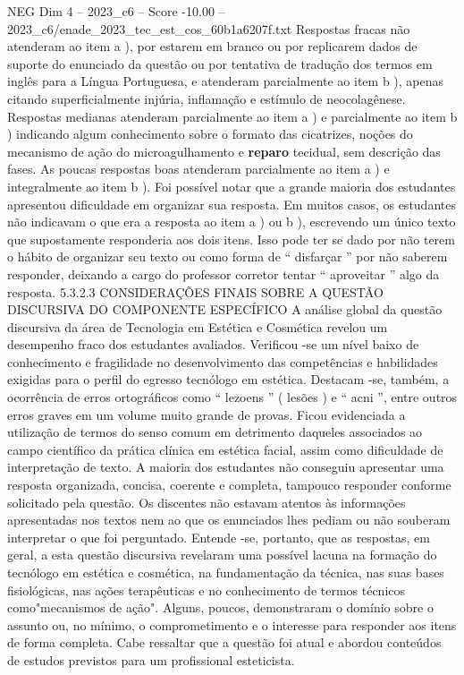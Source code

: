 \begin{textsample}{NEG Dim 4 – 2023\_c6 – Score -10.00 – 2023\_c6/enade\_2023\_tec\_est\_cos\_60b1a6207f.txt}
Respostas fracas não atenderam ao item a ), por estarem em branco ou por replicarem dados de suporte do enunciado da questão ou por tentativa de tradução dos termos em inglês para a Língua Portuguesa, e atenderam parcialmente ao item b ), apenas citando superficialmente injúria, inflamação e estímulo de neocolagênese.
Respostas medianas atenderam parcialmente ao item a ) e parcialmente ao item b ) indicando algum conhecimento sobre o formato das cicatrizes, noções do mecanismo de ação do microagulhamento e \textbf{reparo} tecidual, sem descrição das fases.
As poucas respostas boas atenderam parcialmente ao item a ) e integralmente ao item b ).
Foi possível notar que a grande maioria dos estudantes apresentou dificuldade em organizar sua resposta.
Em muitos casos, os estudantes não indicavam o que era a resposta ao item a ) ou b ), escrevendo um único texto que supostamente responderia aos dois itens.
Isso pode ter se dado por não terem o hábito de organizar seu texto ou como forma de “ disfarçar ” por não saberem responder, deixando a cargo do professor corretor tentar “ aproveitar ” algo da resposta. 5.3.2.3 CONSIDERAÇÕES FINAIS SOBRE A QUESTÃO DISCURSIVA DO COMPONENTE ESPECÍFICO A análise global da questão discursiva da área de Tecnologia em Estética e Cosmética revelou um desempenho fraco dos estudantes avaliados.
Verificou -se um nível baixo de conhecimento e fragilidade no desenvolvimento das competências e habilidades exigidas para o perfil do egresso tecnólogo em estética.
Destacam -se, também, a ocorrência de erros ortográficos como “ lezoens ” ( lesões ) e “ acni ”, entre outros erros graves em um volume muito grande de provas.
Ficou evidenciada a utilização de termos do senso comum em detrimento daqueles associados ao campo científico da prática clínica em estética facial, assim como dificuldade de interpretação de texto.
A maioria dos estudantes não conseguiu apresentar uma resposta organizada, concisa, coerente e completa, tampouco responder conforme solicitado pela questão.
Os discentes não estavam atentos às informações apresentadas nos textos nem ao que os enunciados lhes pediam ou não souberam interpretar o que foi perguntado.
Entende -se, portanto, que as respostas, em geral, a esta questão discursiva revelaram uma possível lacuna na formação do tecnólogo em estética e cosmética, na fundamentação da técnica, nas suas bases fisiológicas, nas ações terapêuticas e no conhecimento de termos técnicos como"mecanismos de ação".
Alguns, poucos, demonstraram o domínio sobre o assunto ou, no mínimo, o comprometimento e o interesse para responder aos itens de forma completa.
Cabe ressaltar que a questão foi atual e abordou conteúdos de estudos previstos para um profissional esteticista.

\end{textsample}
